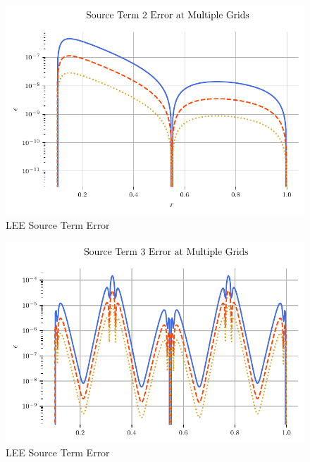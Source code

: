 \begin{figure}[h!]
    \centering
    \includegraphics{../../../CodeRun/04-plotReport/tex-outputs/MMS1_SourceTermError2.pdf}
    \caption{LEE Source Term Error}
    \label{fig:7}
\end{figure}


\begin{figure}[h!]
    \centering
    \includegraphics{../../../CodeRun/04-plotReport/tex-outputs/MMS1_SourceTermError3.pdf}
    \caption{LEE Source Term Error}
    \label{fig:7}
\end{figure}


